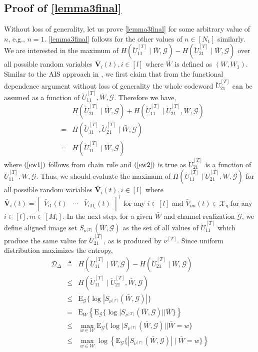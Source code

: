 \documentclass[11pt]{article}
\begin{document}
\subsection{Proof of \eqref{lemma3final}}
Without loss of generality, let us prove \eqref{lemma3final} for some arbitrary value of $n$, e.g., $n=1$. \eqref{lemma3final} follows for the other values of $n\in[N_1]$ similarly. We are interested in the maximum of $H(\breve{U}_{11}^{[T]}\mid \bar{W},\mathcal{G})-H(\breve{U}_{21}^{[T]}\mid \bar{W},\mathcal{G})$ over all possible random variables $\bar{\mathbf{V}}_i(t),i\in[l]$ where $\bar{W}$ is defined as $(W,W_1)$. Similar to the AIS approach in \cite{Arash_Jafar_PN}, we first claim that from the functional dependence argument without loss of generality the whole codeword $\breve{U}_{21}^{[T]}$ can be assumed as a function of $\breve{U}_{11}^{[T]},\bar{W},\mathcal{G}$. Therefore we have,
\begin {eqnarray}
&&H(\breve{U}_{21}^{[T]}\mid \bar{W},\mathcal{G})+H(\breve{U}_{11}^{[T]}\mid \breve{U}_{21}^{[T]},\bar{W},\mathcal{G})\nonumber\\
&=&H(\breve{U}_{11}^{[T]},\breve{U}_{21}^{[T]}\mid \bar{W},\mathcal{G})\label{ew1}\\
&=&H(\breve{U}_{11}^{[T]}\mid \bar{W},\mathcal{G})\label{ew2}
\end{eqnarray}
where $(\ref{ew1})$ follows from chain rule and $(\ref{ew2})$ is true as $\breve{U}_{21}^{[T]}$ is a function of $\breve{U}_{11}^{[T]},\bar{W},\mathcal{G}$. Thus, we should evaluate the maximum of $H(\breve{U}_{11}^{[T]}\mid \breve{U}_{21}^{[T]},\bar{W},\mathcal{G})$ for all possible random variables $\bar{\mathbf{V}}_i(t),i\in[l]$ where $\bar{\mathbf{V}}_i(t)=\begin{bmatrix}\bar{V}_{i1}(t)&\cdots&\bar{V}_{iM_i}(t)\end{bmatrix}^\dagger$ for any $i\in[l]$ and $\bar{V}_{im}(t)\in\mathcal{X}_{\eta}$ for any $i\in[l],m\in[M_i]$. In the next step, for a given $\bar{W}$ and channel realization $\mathcal{G}$, we define aligned image set $S_{\nu^{[T]}}(\bar{W},\mathcal{G})$ as the set of all values of $\breve{U}_{11}^{[T]}$ which produce  the same value for $\breve{U}_{21}^{[T]}$, as is produced by $\nu^{[T]}$. Since uniform distribution maximizes the entropy,
\begin{eqnarray}
\mathcal{D}_{\Delta}&\triangleq&H(\breve{U}_{11}^{[T]}\mid \bar{W},\mathcal{G})-H(\breve{U}_{21}^{[T]}\mid \bar{W},\mathcal{G})\nonumber\\
&\le& H(\breve{U}_{11}^{[T]}\mid \breve{U}_{21}^{[T]},\bar{W},\mathcal{G})\nonumber\\
&\le&\mbox{E}_{\mathcal{G}}\{\log{\left|S_{\nu^{[T]}}(\bar{W},\mathcal{G})\right| \}}\label{jen0}\\
&=&\mbox{E}_{\bar{W}}\left\{\mbox{E}_{\mathcal{G}}\{\log{|S_{\nu^{[T]}}(\bar{W},\mathcal{G})}|\mid \bar{W}\}\right\}\label{expw}\\
&\le&\max_{w\in\mathcal{W}}\mbox{E}_{\mathcal{G}}\{\log{|S_{\nu^{[T]}}(\bar{W},\mathcal{G})}|\mid \bar{W}=w\}\label{expw2}\\
&\le&\max_{w\in\mathcal{W}}\log{\left\{\mbox{E}_{\mathcal{G}}\{|S_{\nu^{[T]}}(\bar{W},\mathcal{G})|\mid \bar{W}=w\}\right\}}\label{jen}
\end{eqnarray}  
\end{document}
